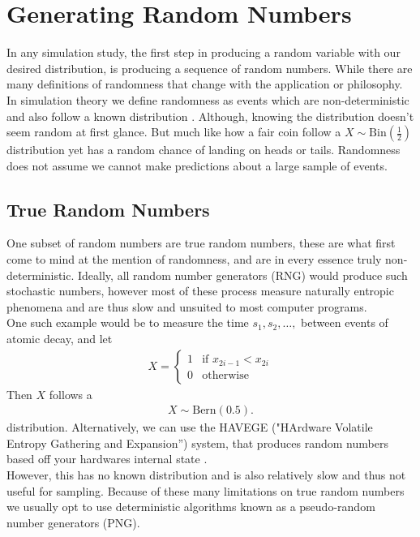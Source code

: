 \documentclass{article}
\begin{document}
\section{Generating Random Numbers}
In any simulation study, the first step in producing a random variable with our desired 
distribution, is producing a sequence of random numbers.
While there are many definitions of randomness that change with the application or 
philosophy.
In simulation theory we define randomness as events which are non-deterministic 
and also follow a known distribution \cite{shiryaev2016probability}. 
Although, knowing the distribution doesn't seem random at first glance. 
But much like how a fair coin follow a $X \sim \text{Bin}(\frac{1}{2})$ distribution
yet has a random chance of landing on heads or tails. Randomness does not assume we 
cannot make predictions about a large sample of events.

\subsection{True Random Numbers}
One subset of random numbers are true random numbers, these are what first come to 
mind at the mention of randomness, and are in every essence truly non-deterministic.
Ideally, all random number generators (RNG) would produce such stochastic numbers, 
however most of these process measure naturally entropic phenomena and are thus
slow and unsuited to most computer programs.\\
One such example would be to measure the time $s_1,s_2,\dots,$ between events of atomic decay,
and let 
\begin{align}
 X =
    \begin{cases} 
      1 & \text{if } x_{2i-1}<x_{2i} \\ 
      0 & \text{otherwise}
    \end{cases}
\end{align}
Then $X$ follows a 
\begin{align*}
    X \sim \text{Bern}(0.5).
\end{align*}
distribution.
Alternatively, we can use the HAVEGE ("HArdware Volatile Entropy Gathering and Expansion”)
\label{point: HAVEGE} system,
that produces random numbers based off your hardwares internal state \cite{gentle2003random}. 
\\
However, this has no known distribution and is also relatively slow and thus not useful for sampling.
Because of these many limitations on true random numbers we usually opt to
use deterministic algorithms known as a pseudo-random number generators (PNG).
\end{document}
